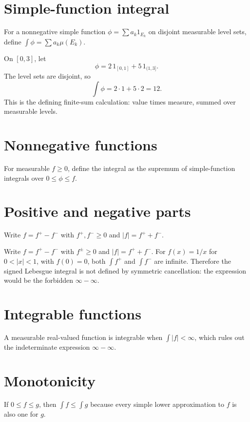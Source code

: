 \section{Simple-function integral}
For a nonnegative simple function $\phi=\sum a_k1_{E_k}$ on disjoint measurable level sets, define $\int\phi=\sum a_k\mu(E_k)$.


\begin{example}\label{ex:iii03-expand-01}
On \([0,3]\), let
\[
\phi=2\,1_{[0,1]}+5\,1_{(1,3]}.
\]
The level sets are disjoint, so
\[
\int\phi=2\cdot1+5\cdot2=12.
\]
This is the defining finite-sum calculation: value times measure, summed over
measurable levels.
\end{example}
\section{Nonnegative functions}
For measurable $f\ge0$, define the integral as the supremum of simple-function integrals over $0\le\phi\le f$.

\section{Positive and negative parts}
Write $f=f^+-f^-$ with $f^+,f^-\ge0$ and $|f|=f^++f^-$.


\begin{example}\label{ex:iii03-expand-02}
Write \(f=f^+-f^-\) with \(f^\pm\ge0\) and \(|f|=f^++f^-\). For
\(f(x)=1/x\) for \(0<|x|<1\), with \(f(0)=0\), both \(\int f^+\) and \(\int f^-\) are infinite.
Therefore the signed Lebesgue integral is not defined by symmetric cancellation:
the expression would be the forbidden \(\infty-\infty\).
\end{example}
\section{Integrable functions}
A measurable real-valued function is integrable when $\int|f|<\infty$, which rules out the indeterminate expression $\infty-\infty$.

\section{Monotonicity}
If $0\le f\le g$, then $\int f\le\int g$ because every simple lower approximation to $f$ is also one for $g$.

